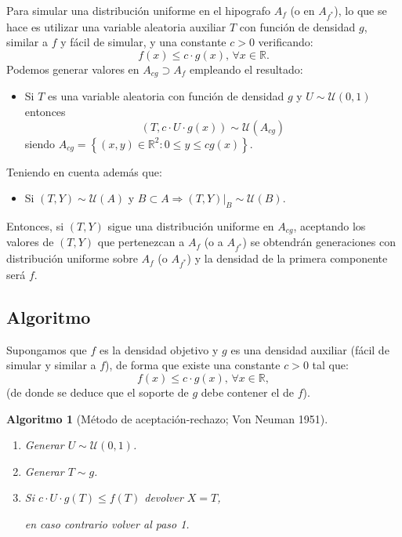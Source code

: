 \documentclass[
]{book}
\providecommand{\tightlist}{%
  \setlength{\itemsep}{0pt}\setlength{\parskip}{0pt}}
\theoremstyle{break}
\newtheorem{conjecture}{Algoritmo}[chapter]
\theoremstyle{nonumberplain}
\begin{document}
Para simular una distribución uniforme en el hipografo \(A_{f}\) (o en \(A_{f^{\ast}}\)), lo que se hace es utilizar una variable aleatoria auxiliar \(T\) con función de densidad \(g\), similar a \(f\) y fácil de simular, y una constante \(c > 0\) verificando:
\[f(x) \leq c\cdot g(x) \text{, }\forall x\in \mathbb{R}.\]
Podemos generar valores en \(A_{cg} \supset A_{f}\) empleando el resultado:

\begin{itemize}
\tightlist
\item
  Si \(T\) es una variable aleatoria con función de densidad \(g\)
  y \(U \sim \mathcal{U}(0, 1)\) entonces
  \[\left( T,c\cdot U\cdot g(x) \right) \sim \mathcal{U}\left(
  A_{cg}\right)\]
  siendo
  \(A_{cg}=\left\{ \left( x, y \right) \in \mathbb{R}^{2} : 0 \leq y \leq cg\left( x \right) \right\}\).
\end{itemize}

Teniendo en cuenta además que:

\begin{itemize}
\tightlist
\item
  Si \(\left( T,Y\right) \sim \mathcal{U}\left( A\right)\) y
  \(B \subset A\Rightarrow \left. \left( T,Y\right) \right\vert _{B} \sim \mathcal{U}\left(B\right)\).
\end{itemize}

Entonces, si \(\left( T, Y \right)\) sigue una distribución uniforme en \(A_{cg}\), aceptando los valores de \(\left( T, Y\right)\) que pertenezcan a \(A_{f}\) (o a \(A_{f^{\ast}}\)) se obtendrán generaciones con distribución uniforme sobre \(A_{f}\) (o \(A_{f^{\ast}}\)) y la densidad de la primera componente será \(f\).

\hypertarget{algoritmo}{%
\subsection{Algoritmo}\label{algoritmo}}

Supongamos que \(f\) es la densidad objetivo y \(g\) es una densidad
auxiliar (fácil de simular y similar a \(f\)), de forma que
existe una constante \(c>0\) tal que:
\[f(x) \leq c\cdot g(x) 
\text{, }\forall x\in \mathbb{R},\]
(de donde se deduce que el soporte de \(g\) debe contener el de \(f\)).

\begin{conjecture}[Método de aceptación-rechazo; Von Neuman 1951]
\protect\hypertarget{cnj:aceptacion-rechazo}{}\label{cnj:aceptacion-rechazo}

\begin{enumerate}
\def\labelenumi{\arabic{enumi}.}
\item
  Generar \(U \sim \mathcal{U}(0, 1)\).
\item
  Generar \(T\sim g\).
\item
  Si \(c\cdot U\cdot g\left( T\right) \leq f\left( T\right)\)
  devolver \(X=T\),

  en caso contrario volver al paso 1.
\end{enumerate}

\end{conjecture}
\end{document}
